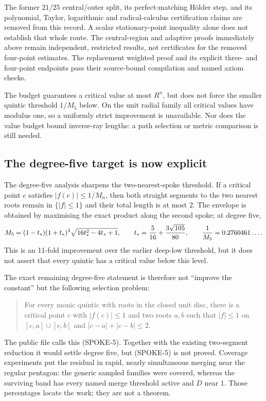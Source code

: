 \documentclass[11pt]{article}
\begin{document}
The former $21/25$ central/outer split, its perfect-matching H\"older step,
and its polynomial, Taylor, logarithmic and radical-calculus certification
claims are removed from this record. A scalar stationary-point inequality
alone does not establish that whole route. The central-region and adaptive
proofs immediately above remain independent, restricted results, not
certificates for the removed four-point estimates. The replacement weighted
proof and its explicit three- and four-point endpoints pass their source-bound
compilation and named axiom checks.

The budget guarantees a critical value at most $R^n$, but does not force
the smaller quintic threshold $1/M_5$ below.  On the unit radial family all
critical values have modulus one, so a uniformly strict improvement is
unavailable.  Nor does the value budget bound inverse-ray lengths: a path
selection or metric comparison is still needed.

\subsection*{The degree-five target is now explicit}

The degree-five analysis sharpens the two-nearest-spoke threshold.  If a
critical point $c$ satisfies $|f(c)|\le1/M_n$, then both straight segments to
the two nearest roots remain in $\{|f|\le1\}$ and their total length is at
most $2$.  The envelope is obtained by maximising the exact product along the
second spoke; at degree five,
\[
 M_5=(1-t_*)(1+t_*)^3\sqrt{16t_*^2-4t_*+1},
 \qquad
 t_*={5\over16}+{3\sqrt{105}\over80},
 \qquad
 {1\over M_5}=0.2760461\ldots.
\]
This is an 11-fold improvement over the earlier deep-low threshold, but it
does not assert that every quintic has a critical value below this level.

The exact remaining degree-five statement is therefore not ``improve the
constant'' but the following selection problem:
\begin{quote}
For every monic quintic with roots in the closed unit disc, there is a
critical point $c$ with $|f(c)|\le1$ and two roots $a,b$ such that
$|f|\le1$ on $[c,a]\cup[c,b]$ and
$|c-a|+|c-b|\le2$.
\end{quote}
The public file calls this (SPOKE-5).  Together with the existing
two-segment reduction it would settle degree five, but (SPOKE-5) is not
proved.  Coverage experiments put the residual in rapid, nearly simultaneous
merging near the regular pentagon: the generic sampled families were covered,
whereas the surviving band has every named merge threshold active and
$D$ near $1$.  Those percentages locate the work; they are not a theorem.
\end{document}

